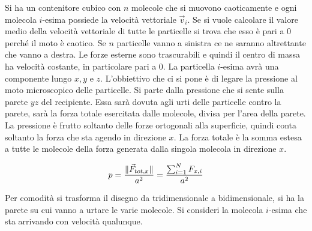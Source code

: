Si ha un contenitore cubico con $n$ molecole che si muovono caoticamente e ogni molecola $i$-esima possiede la velocità vettoriale $\vec{v}_i$. Se si vuole calcolare il valore medio della velocità vettoriale di tutte le particelle si trova che esso è pari a $0$ perché il moto è caotico. Se $n$ particelle vanno a sinistra ce ne saranno altrettante che vanno a destra. Le forze esterne sono trascurabili e quindi il centro di massa ha velocità costante, in particolare pari a $0$. La particella $i$-esima avrà una componente lungo $x,y$ e $z$. L'obbiettivo che ci si pone è di legare la pressione al moto microscopico delle particelle. Si parte dalla pressione che si sente sulla parete $yz$ del recipiente. Essa sarà dovuta agli urti delle particelle contro la parete, sarà la forza totale esercitata dalle molecole, divisa per l'area della parete. La pressione è frutto soltanto delle forze ortogonali alla superficie, quindi conta soltanto la forza che sta agendo in direzione $x$. La forza totale è la somma estesa a tutte le molecole della forza generata dalla singola molecola in direzione $x$.

\[
	p = \frac{\lVert\vec{F}_{tot,x}\rVert }{a^2} = \frac{\sum_{i=1}^N F_{x,i}}{a^2}
\]

Per comodità si trasforma il disegno da tridimensionale a bidimensionale, si ha la parete su cui vanno a urtare le varie molecole. Si consideri la molecola $i$-esima che sta arrivando con velocità qualunque.

